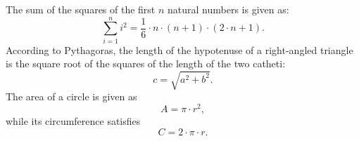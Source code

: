 \documentclass{article}
\begin{document}
The sum of the squares of the first $n$ natural numbers is given as:
$$ \sum\limits_{i=1}^{n} i^{2} = \frac{1}{6} \cdot n \cdot (n+1) \cdot (2\cdot n + 1). $$
According to Pythagoras, the length of the hypotenuse of a right-angled triangle is
the square root of the squares of the length of the two catheti:
$$ c = \sqrt{a^{2} + b^{2}}.  $$
The area of a circle is given as
$$  A = \pi \cdot r^{2},   $$
while its circumference satisfies
$$ C = 2 \cdot \pi \cdot r.  $$
\end{document}
